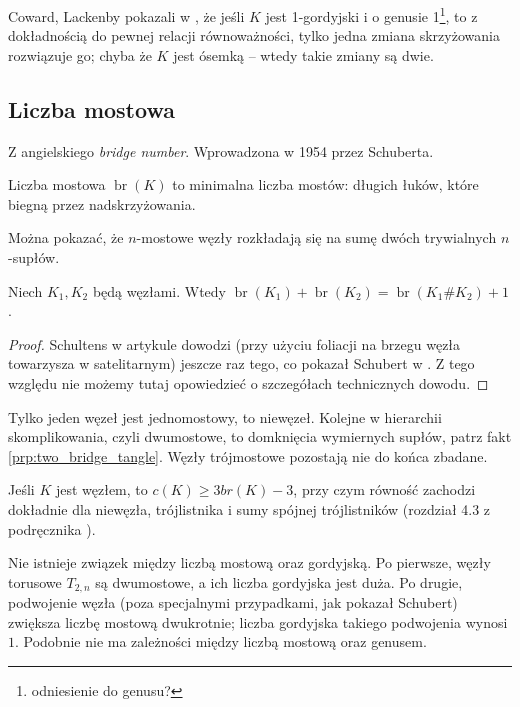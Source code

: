 Coward, Lackenby pokazali w \cite{coward11}, że jeśli $K$ jest 1-gordyjski i o genusie 1\footnote{odniesienie do genusu?}, to z dokładnością do pewnej relacji równoważności, tylko jedna zmiana skrzyżowania rozwiązuje go; chyba że $K$ jest ósemką -- wtedy takie zmiany są dwie.


\subsection{Liczba mostowa} %
\label{sub:bridge_index}
Z angielskiego \emph{bridge number}.
Wprowadzona w 1954 przez Schuberta.
\begin{definition}
    Liczba mostowa $\operatorname{br}(K)$ to minimalna liczba mostów:
    długich łuków, które biegną przez nadskrzyżowania.
\end{definition}

Można pokazać, że $n$-mostowe węzły rozkładają się na sumę dwóch trywialnych $n$-supłów.

\begin{proposition}
    Niech $K_1, K_2$ będą węzłami.
    Wtedy $\operatorname{br} (K_1) + \operatorname{br}(K_2) = \operatorname{br}(K_1 \# K_2) + 1$.
\end{proposition}

\begin{proof}
    Schultens w artykule \cite{schultens03} dowodzi (przy użyciu foliacji na brzegu węzła towarzysza w satelitarnym) jeszcze raz tego, co pokazał Schubert w \cite{schubert54}.
    Z tego względu nie możemy tutaj opowiedzieć o szczegółach technicznych dowodu.
\end{proof}

Tylko jeden węzeł jest jednomostowy, to niewęzeł.
Kolejne w hierarchii skomplikowania, czyli dwumostowe,
to domknięcia wymiernych supłów, patrz fakt \ref{prp:two_bridge_tangle}.
Węzły trójmostowe pozostają nie do końca zbadane.

\begin{conjecture}
    Jeśli $K$ jest węzłem, to $c(K) \ge 3 br(K) - 3$, przy czym równość zachodzi dokładnie dla niewęzła, trójlistnika i sumy spójnej trójlistników (rozdział 4.3 z podręcznika \cite{murasugi96}).
\end{conjecture}

Nie istnieje związek między liczbą mostową oraz gordyjską.
Po pierwsze, węzły torusowe $T_{2,n}$ są dwumostowe, a ich liczba gordyjska jest duża.
Po drugie, podwojenie węzła (poza specjalnymi przypadkami, jak pokazał Schubert) zwiększa liczbę mostową dwukrotnie; liczba gordyjska takiego podwojenia wynosi $1$.
Podobnie nie ma zależności między liczbą mostową oraz genusem.

